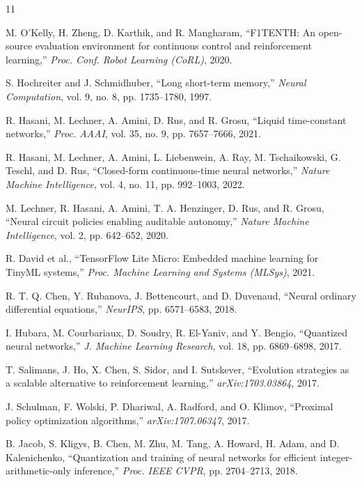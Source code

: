 \documentclass[10pt,journal]{IEEEtran}
\begin{document}
\begin{thebibliography}{11}

 M. O'Kelly, H. Zheng, D. Karthik, and R. Mangharam, ``F1TENTH: An open-source evaluation environment for continuous control and reinforcement learning,'' \emph{Proc. Conf. Robot Learning (CoRL)}, 2020.

 S. Hochreiter and J. Schmidhuber, ``Long short-term memory,'' \emph{Neural Computation}, vol. 9, no. 8, pp. 1735--1780, 1997.

 R. Hasani, M. Lechner, A. Amini, D. Rus, and R. Grosu, ``Liquid time-constant networks,'' \emph{Proc. AAAI}, vol. 35, no. 9, pp. 7657--7666, 2021.

 R. Hasani, M. Lechner, A. Amini, L. Liebenwein, A. Ray, M. Tschaikowski, G. Teschl, and D. Rus, ``Closed-form continuous-time neural networks,'' \emph{Nature Machine Intelligence}, vol. 4, no. 11, pp. 992--1003, 2022.

 M. Lechner, R. Hasani, A. Amini, T. A. Henzinger, D. Rus, and R. Grosu, ``Neural circuit policies enabling auditable autonomy,'' \emph{Nature Machine Intelligence}, vol. 2, pp. 642--652, 2020.

 R. David et al., ``TensorFlow Lite Micro: Embedded machine learning for TinyML systems,'' \emph{Proc. Machine Learning and Systems (MLSys)}, 2021.

 R. T. Q. Chen, Y. Rubanova, J. Bettencourt, and D. Duvenaud, ``Neural ordinary differential equations,'' \emph{NeurIPS}, pp. 6571--6583, 2018.

 I. Hubara, M. Courbariaux, D. Soudry, R. El-Yaniv, and Y. Bengio, ``Quantized neural networks,'' \emph{J. Machine Learning Research}, vol. 18, pp. 6869--6898, 2017.

 T. Salimans, J. Ho, X. Chen, S. Sidor, and I. Sutskever, ``Evolution strategies as a scalable alternative to reinforcement learning,'' \emph{arXiv:1703.03864}, 2017.

 J. Schulman, F. Wolski, P. Dhariwal, A. Radford, and O. Klimov, ``Proximal policy optimization algorithms,'' \emph{arXiv:1707.06347}, 2017.

 B. Jacob, S. Kligys, B. Chen, M. Zhu, M. Tang, A. Howard, H. Adam, and D. Kalenichenko, ``Quantization and training of neural networks for efficient integer-arithmetic-only inference,'' \emph{Proc. IEEE CVPR}, pp. 2704--2713, 2018.

\end{thebibliography}
\end{document}
